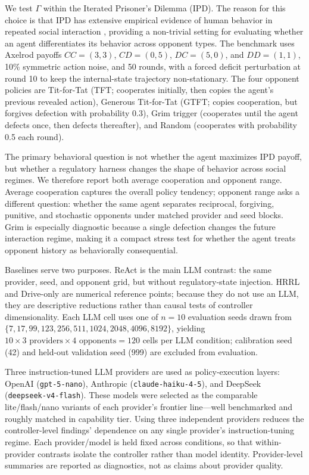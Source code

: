 \documentclass{article}
\begin{document}
We test $\Gamma$ within the Iterated Prisoner's Dilemma (IPD). The reason for this choice is that IPD has extensive empirical evidence of human behavior in repeated social interaction \citep{axelrod1984evolution,nowak2006evolutionary,porcelli2017stress}, providing a non-trivial setting for evaluating whether an agent differentiates its behavior across opponent types. The benchmark uses Axelrod payoffs $CC=(3,3)$, $CD=(0,5)$, $DC=(5,0)$, and $DD=(1,1)$, 10\% symmetric action noise, and 50 rounds, with a forced deficit perturbation at round 10 to keep the internal-state trajectory non-stationary. The four opponent policies are Tit-for-Tat (TFT; cooperates initially, then copies the agent's previous revealed action), Generous Tit-for-Tat (GTFT; copies cooperation, but forgives defection with probability 0.3), Grim trigger (cooperates until the agent defects once, then defects thereafter), and Random (cooperates with probability 0.5 each round).

The primary behavioral question is not whether the agent maximizes IPD payoff, but whether a regulatory harness changes the shape of behavior across social regimes. We therefore report both average cooperation and opponent range. Average cooperation captures the overall policy tendency; opponent range asks a different question: whether the same agent separates reciprocal, forgiving, punitive, and stochastic opponents under matched provider and seed blocks. Grim is especially diagnostic because a single defection changes the future interaction regime, making it a compact stress test for whether the agent treats opponent history as behaviorally consequential.

Baselines serve two purposes. ReAct is the main LLM contrast: the same provider, seed, and opponent grid, but without regulatory-state injection. HRRL and Drive-only are numerical reference points; because they do not use an LLM, they are descriptive reductions rather than causal tests of controller dimensionality. Each LLM cell uses one of $n=10$ evaluation seeds drawn from $\{7, 17, 99, 123, 256, 511, 1024, 2048, 4096, 8192\}$, yielding $10 \times 3 \text{ providers} \times 4 \text{ opponents} = 120$ cells per LLM condition; calibration seed (42) and held-out validation seed (999) are excluded from evaluation.

Three instruction-tuned LLM providers are used as policy-execution layers: OpenAI (\texttt{gpt-5-nano}), Anthropic (\texttt{claude-haiku-4-5}), and DeepSeek (\texttt{deepseek-v4-flash}). These models were selected as the comparable lite/flash/nano variants of each provider's frontier line---well benchmarked and roughly matched in capability tier. Using three independent providers reduces the controller-level findings' dependence on any single provider's instruction-tuning regime. Each provider/model is held fixed across conditions, so that within-provider contrasts isolate the controller rather than model identity. Provider-level summaries are reported as diagnostics, not as claims about provider quality.
\end{document}
